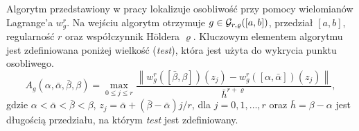 \documentclass[oik, pdftex, man]{mgrwms}
\begin{document}
    Algorytm przedstawiony w pracy \cite{CoDF} lokalizuje osobliwość przy pomocy wielomianów Lagrange'a $w_{g}^{r}$. Na wejściu algorytm otrzymuje $g \in \mathcal{G}_{r,\varrho}([a,b])$, przedział $[a,b]$, regularność $r$ oraz współczynnik Höldera $\varrho$. Kluczowym elementem algorytmu jest zdefiniowana poniżej wielkość (\textit{test}), która jest użyta do wykrycia punktu osobliwego.
    \begin{equation}
        \label{eqn:test}
        A_{g}(\alpha, \bar{\alpha}, \bar{\beta}, \beta)=\max _{0 \leq j \leq r} \frac{\left\|w_{g}^{r}([\bar{\beta}, \beta])\left(z_{j}\right)-w_{g}^{r}([\alpha, \bar{\alpha}])\left(z_{j}\right)\right\|}{\bar{h}^{r+\varrho}},
    \end{equation}
    gdzie $\alpha<\bar{\alpha}<\bar{\beta}<\beta$, $z_{j} = \bar{\alpha} + (\bar{\beta} - \bar{\alpha})j/r$, dla $j=0,1,\dots,r$ oraz $\bar{h} = \beta - \alpha$ jest długością przedziału, na którym \textit{test} jest zdefiniowany.
\end{document}
